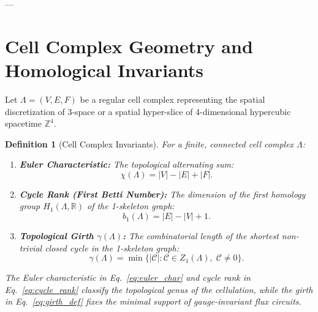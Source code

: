 \documentclass[11pt,reqno]{article}
\newtheorem{definition}[theorem]{Definition}
\begin{document}
---

\section{Cell Complex Geometry and Homological Invariants}
\label{sec:cell_geometry}

Let $\Lambda = (V, E, F)$ be a regular cell complex representing the spatial discretization of 3-space or a spatial hyper-slice of 4-dimensional hypercubic spacetime $\mathbb{Z}^4$.

\begin{definition}[Cell Complex Invariants]
For a finite, connected cell complex $\Lambda$:
\begin{enumerate}
    \item \textbf{Euler Characteristic:} The topological alternating sum:
    \begin{equation}
        \label{eq:euler_char}
        \chi(\Lambda) = |V| - |E| + |F|.
    \end{equation}
    \item \textbf{Cycle Rank (First Betti Number):} The dimension of the first homology group $H_1(\Lambda, \mathbb{R})$ of the 1-skeleton graph:
    \begin{equation}
        \label{eq:cycle_rank}
        b_1(\Lambda) = |E| - |V| + 1.
    \end{equation}
    \item \textbf{Topological Girth $\gamma(\Lambda)$:} The combinatorial length of the shortest non-trivial closed cycle in the 1-skeleton graph:
    \begin{equation}
        \label{eq:girth_def}
        \gamma(\Lambda) = \min \{ |\mathcal{C}| : \mathcal{C} \in Z_1(\Lambda), \; \mathcal{C} \neq 0 \}.
    \end{equation}
\end{enumerate}
The Euler characteristic in Eq.~\eqref{eq:euler_char} and cycle rank in Eq.~\eqref{eq:cycle_rank} classify the topological genus of the cellulation, while the girth in Eq.~\eqref{eq:girth_def} fixes the minimal support of gauge-invariant flux circuits.
\end{definition}
\end{document}
